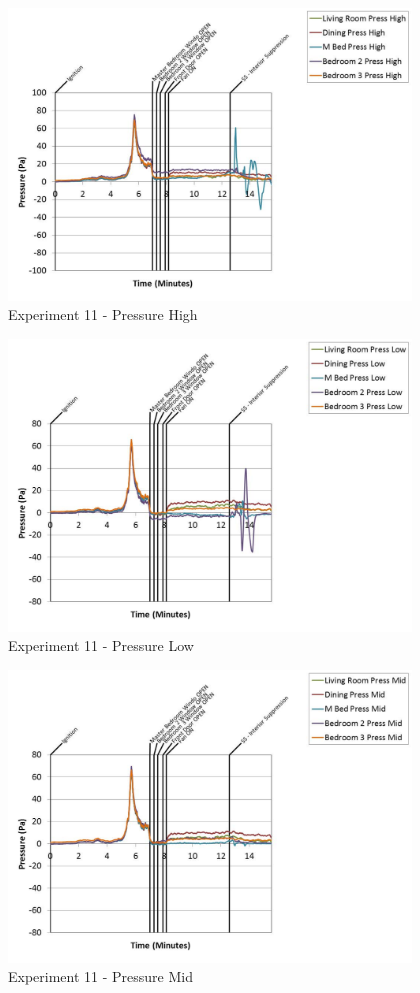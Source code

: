 \documentclass{article}
\begin{document}
\begin{appendices}
	\begin{figure}[h!]
		\centering
		\includegraphics[height=3.05in]{0_Images/Results_Charts/Exp_11_Charts/PressureHigh.pdf}
		\caption{Experiment 11 - Pressure High}
	\end{figure}
 
	\clearpage

	\begin{figure}[h!]
		\centering
		\includegraphics[height=3.05in]{0_Images/Results_Charts/Exp_11_Charts/PressureLow.pdf}
		\caption{Experiment 11 - Pressure Low}
	\end{figure}
 

	\begin{figure}[h!]
		\centering
		\includegraphics[height=3.05in]{0_Images/Results_Charts/Exp_11_Charts/PressureMid.pdf}
		\caption{Experiment 11 - Pressure Mid}
	\end{figure}
 

\end{appendices}
\end{document}
